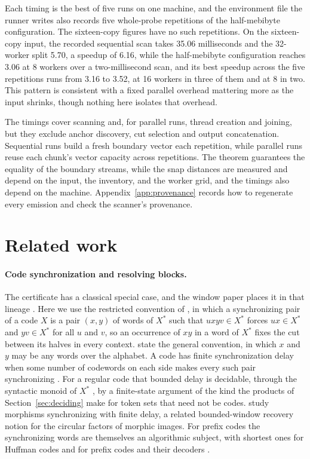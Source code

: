 \documentclass[11pt,a4paper]{article}
\theoremstyle{definition}
\theoremstyle{plain}
\begin{document}
Each timing is the best of five runs on one machine, and the environment file the runner writes also records five
whole-probe repetitions of the half-mebibyte configuration. The sixteen-copy figures have no such repetitions. On the
sixteen-copy input, the recorded sequential scan takes 35.06 milliseconds and the 32-worker split 5.70, a speedup of
6.16, while the half-mebibyte configuration reaches 3.06 at 8 workers over a two-millisecond scan, and its best speedup
across the five repetitions runs from 3.16 to 3.52, at 16 workers in three of them and at 8 in two. This pattern is
consistent with a fixed parallel overhead mattering more as the input shrinks, though nothing here isolates that
overhead.

The timings cover scanning and, for parallel runs, thread creation and joining, but they exclude anchor discovery, cut
selection and output concatenation. Sequential runs build a fresh boundary vector each repetition, while parallel runs
reuse each chunk's vector capacity across repetitions. The theorem guarantees the equality of the boundary streams,
while the snap distances are measured and depend on the input, the inventory, and the worker grid, and the timings also
depend on the machine. Appendix~\ref{app:provenance} records how to regenerate every emission and check the scanner's
provenance.

\section{Related work}\label{sec:related}

\paragraph{Code synchronization and resolving blocks.} The certificate has a classical special case, and the window
paper places it in that lineage \citep{nidhogg2026splitwindows}. Here we use the restricted convention of
\citet[p.~17-01]{lassez1976messages}, in which a synchronizing pair of a code $X$ is a pair $(x, y)$ of words of $X^{*}$
such that $uxyv \in X^{*}$ forces $ux \in X^{*}$ and $yv \in X^{*}$ for all $u$ and $v$, so an occurrence of $xy$ in a
word of $X^{*}$ fixes the cut between its halves in every context. \citet[p.~373]{berstel2010codes} state the general
convention, in which $x$ and $y$ may be any words over the alphabet. A code has finite synchronization delay when some
number of codewords on each side makes every such pair synchronizing \citep{restivo1975synchronization}. For a regular
code that bounded delay is decidable, through the syntactic monoid of $X^{*}$
\citep[Th\'eor\`eme~2]{lassez1976messages}, by a finite-state argument of the kind the products of
Section~\ref{sec:deciding} make for token sets that need not be codes. \citet{fici2025morphisms} study morphisms
synchronizing with finite delay, a related bounded-window recovery notion for the circular factors of morphic images.
For prefix codes the synchronizing words are themselves an algorithmic subject, with shortest ones for Huffman codes
\citep{biskup2009shortest} and for prefix codes and their decoders \citep{ryzhikov2018short}.
\end{document}

